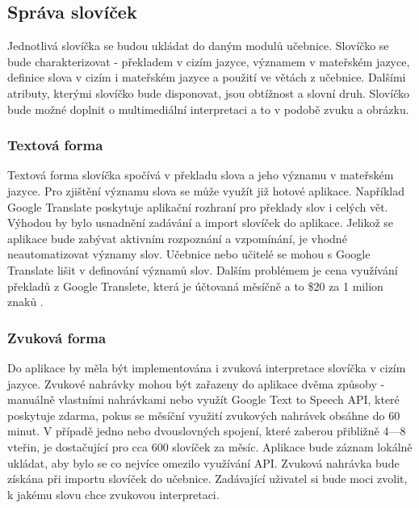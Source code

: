 \documentclass[a4paper,11pt,titlepage,fleqn]{article}
\begin{document}
    \subsection{Správa slovíček}

        Jednotlivá slovíčka se budou ukládat do daným modulů učebnice. Slovíčko se bude charakterizovat - překladem v cizím jazyce, významem v mateřském jazyce, definice slova v cizím i mateřském jazyce a použití ve větách z učebnice. Dalšími atributy, kterými slovíčko bude disponovat, jsou obtížnost a slovní druh. Slovíčko bude možné doplnit o multimediální interpretaci a to v podobě zvuku a obrázku.

        \subsubsection{Textová forma}
            Textová forma slovíčka spočívá v překladu slova a jeho významu v mateřském jazyce. Pro zjištění významu slova se může využít již hotové aplikace. Například Google Translate poskytuje aplikační rozhraní pro překlady slov i celých vět. Výhodou by bylo usnadnění zadávání a import slovíček do aplikace. Jelikož se aplikace bude zabývat aktivním rozpoznání a vzpomínání, je vhodné neautomatizovat významy slov. Učebnice nebo učitelé se mohou s Google Translate lišit v definování významů slov. Dalším problémem je cena využívání překladů z Google Translete, která je účtovaná měsíčně a to \$20 za 1 milion znaků \cite{bib:google-api}.

        \subsubsection{Zvuková forma}
            Do aplikace by měla být implementována i zvuková interpretace slovíčka v cizím jazyce. Zvukové nahrávky mohou být zařazeny do aplikace dvěma způsoby - manuálně vlastními nahrávkami nebo využít Google Text to Speech API, které poskytuje zdarma, pokus se měsíční využití zvukových nahrávek obsáhne do 60 minut\cite{bib:google-api}. V případě jedno nebo dvouslovných spojení, které zaberou přibližně 4—8 vteřin, je dostačující pro cca 600 slovíček za měsíc. Aplikace bude záznam lokálně ukládat, aby bylo se co nejvíce omezilo využívání API. Zvuková nahrávka bude získána při importu slovíček do učebnice. Zadávající uživatel si bude moci zvolit, k jakému slovu chce zvukovou interpretaci.
\end{document}
